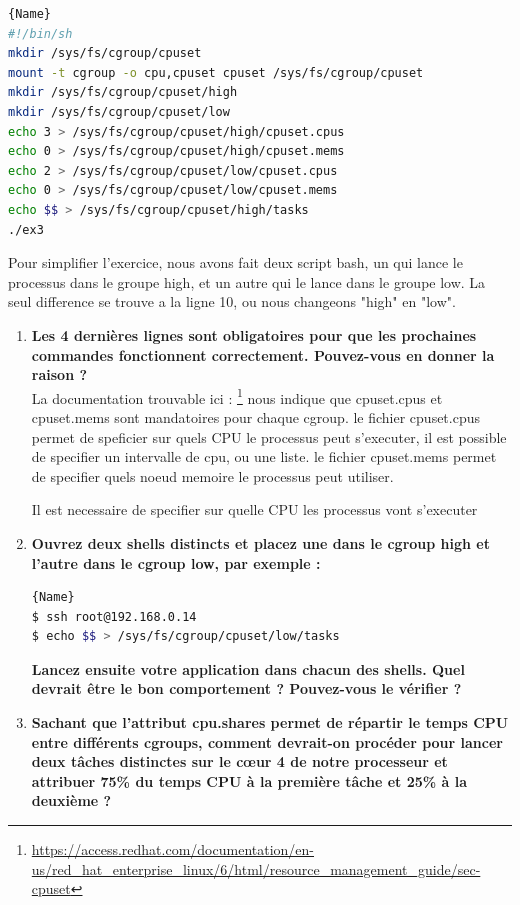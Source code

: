 \documentclass[
	a4paper, %
	10pt, %
]{CSUniSchoolLabReport}
\begin{document}
\begin{lstlisting}[language=bash, firstnumber=1]{Name}
#!/bin/sh
mkdir /sys/fs/cgroup/cpuset
mount -t cgroup -o cpu,cpuset cpuset /sys/fs/cgroup/cpuset
mkdir /sys/fs/cgroup/cpuset/high
mkdir /sys/fs/cgroup/cpuset/low
echo 3 > /sys/fs/cgroup/cpuset/high/cpuset.cpus
echo 0 > /sys/fs/cgroup/cpuset/high/cpuset.mems
echo 2 > /sys/fs/cgroup/cpuset/low/cpuset.cpus
echo 0 > /sys/fs/cgroup/cpuset/low/cpuset.mems
echo $$ > /sys/fs/cgroup/cpuset/high/tasks
./ex3
\end{lstlisting}
Pour simplifier l'exercice, nous avons fait deux script bash, un qui lance le processus dans le groupe high, et un autre qui le lance dans le groupe low.
La seul difference se trouve a la ligne 10, ou nous changeons "high" en "low".


\begin{enumerate}[label=\textbf{\arabic*}]
	\item \textbf{Les 4 dernières lignes sont obligatoires pour que les prochaines commandes fonctionnent correctement. Pouvez-vous en donner la raison ?}\\
	La documentation trouvable ici : \footnote{\href{https://access.redhat.com/documentation/en-us/red_hat_enterprise_linux/6/html/resource_management_guide/sec-cpuset}{https://access.redhat.com/documentation/en-us/red\_hat\_enterprise\_linux/6/html/resource\_management\_guide/sec-cpuset}}
	nous indique que cpuset.cpus et cpuset.mems sont mandatoires pour chaque cgroup.
	le fichier cpuset.cpus permet de speficier sur quels CPU le processus peut s'executer, il est possible de specifier un intervalle de cpu, ou une liste.
	le fichier cpuset.mems permet de specifier quels noeud memoire le processus peut utiliser.
	
	
	Il est necessaire de specifier sur quelle CPU les processus vont s'executer
	\item \textbf{Ouvrez deux shells distincts et placez une dans le cgroup high et l’autre dans le cgroup low, par exemple :}\\
\begin{lstlisting}[language=bash, firstnumber=1]{Name}
$ ssh root@192.168.0.14
$ echo $$ > /sys/fs/cgroup/cpuset/low/tasks
\end{lstlisting}
\textbf{Lancez ensuite votre application dans chacun des shells. Quel devrait être le bon comportement ? Pouvez-vous le vérifier ?}\\


	\item \textbf{Sachant que l’attribut cpu.shares permet de répartir le temps CPU entre différents cgroups, comment devrait-on procéder pour lancer deux tâches distinctes sur le cœur 4 de notre processeur et attribuer 75\% du temps CPU à la première tâche et 25\% à la deuxième ?}\\

\end{enumerate}
\end{document}

